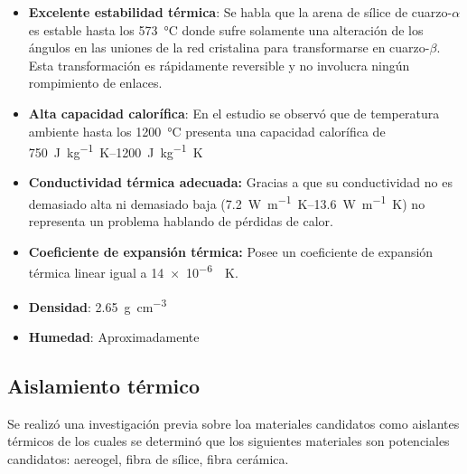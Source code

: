 			\begin{itemize}
				\item \textbf{Excelente estabilidad térmica}: Se habla que la arena de sílice de cuarzo-$\alpha$ es estable hasta los \qty{573}{\degreeCelsius} donde sufre solamente una alteración de los ángulos en las uniones de la red cristalina para transformarse en cuarzo-$\beta$. Esta transformación es rápidamente reversible y no involucra ningún rompimiento de enlaces.
				\item \textbf{Alta capacidad calorífica}: En el estudio se observó que de temperatura ambiente hasta los \qty{1200}{\degreeCelsius} presenta una capacidad calorífica de \qtyrange{750}{1200}{\joule\per\kg\kelvin}
				\item \textbf{Conductividad térmica adecuada:} Gracias a que su conductividad no es demasiado alta ni demasiado baja (\qtyrange{7.2}{13.6}{\watt\per\m\kelvin}) no representa un problema hablando de pérdidas de calor.
				\item \textbf{Coeficiente de expansión térmica:} Posee un coeficiente de expansión térmica linear igual a \qty{14e-6}{\per\kelvin}.
				\item \textbf{Densidad}: \qty{2.65}{\g\per\cm\tothe{3}}
				\item \textbf{Humedad}: Aproximadamente 
			\end{itemize}
			
		\subsection{Aislamiento térmico}
			
			Se realizó una investigación previa sobre loa materiales candidatos como aislantes térmicos de los cuales se determinó que los siguientes materiales son potenciales candidatos: aereogel, fibra de sílice, fibra cerámica.
			
			
			
			